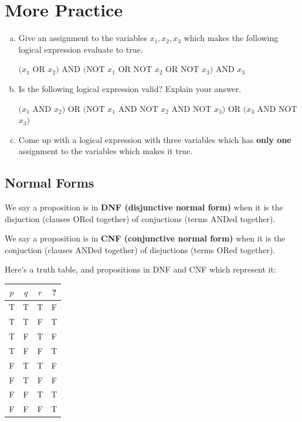 \documentclass[12pt,letterpaper]{article}
\newif\ifsol
\newcommand{\solu}[2]{ \begin{mdframed} \ifsol #2 \else \vspace{#1} \fi \end{mdframed} }
\begin{document}
	    \section*{More Practice}
	\begin{enumerate}[a.]
		\item Give an assignment to the variables $x_1,x_2,x_3$ which makes the following logical expression evaluate to true.

		$(x_1 $ OR $ x_2)$ AND $ ($NOT $ x_1 $ OR $ $NOT $ x_2 $ OR $ $NOT $ x_3) $ AND $ x_3$
		\solu{3cm}{$x_1$ is true, $x_2$ is false, $x_3$ is true}

		\item Is the following logical expression valid? Explain your answer.

		$(x_1 $ AND $ x_2)$ OR $ ($NOT $ x_1 $ AND $ $NOT $ x_2 $ AND $ $NOT $ x_3) $ OR $ (x_3 $ AND $ $NOT $ x_3) $

		\solu{3cm}{Nope, consider $x_1$ is false and $x_2$ is true}

		\item Come up with a logical expression with three variables which has \textbf{only one} assignment to the variables which makes it true.

		\solu{3cm}{All the variables anded together}


    \end{enumerate}

	\subsection*{Normal Forms}
	We say a proposition is in \textbf{DNF (disjunctive normal form)} when it is the disjuction (clauses ORed together) of conjuctions (terms ANDed together).
	
	We say a proposition is in \textbf{CNF (conjunctive normal form)} when it is the conjuction (clauses ANDed together) of disjuctions (terms ORed together). 
	
	Here's a truth table, and propositions in DNF and CNF which represent it:
	
	\begin{tabular}{c|c|c|c}
         $p$ & $q$ & $r$ & ?\\
        \hline
        T & T & T & F \\
        T & T & F & T \\
        T & F & T & F \\
        T & F & F & T \\
        F & T & T & F \\
        F & T & F & F \\
        F & F & T & T \\
        F & F & F & T
    \end{tabular}
    
\end{document}
